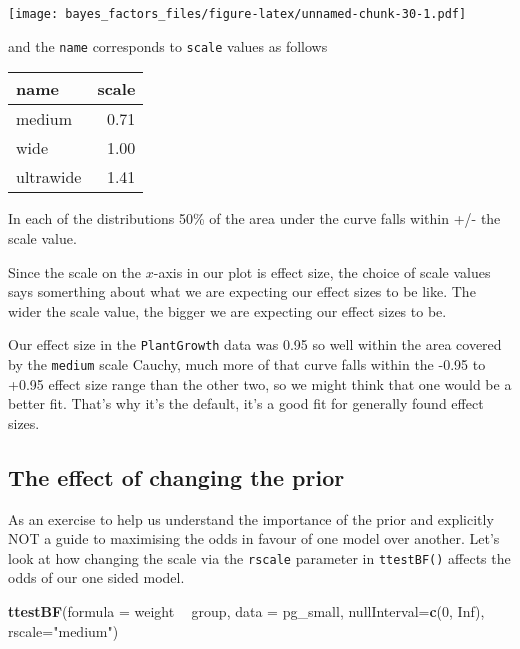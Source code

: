 \documentclass[
]{book}
\newenvironment{Shaded}{\begin{snugshade}}{\end{snugshade}}
\newcommand{\DataTypeTok}[1]{\textcolor[rgb]{0.13,0.29,0.53}{#1}}
\newcommand{\DecValTok}[1]{\textcolor[rgb]{0.00,0.00,0.81}{#1}}
\newcommand{\KeywordTok}[1]{\textcolor[rgb]{0.13,0.29,0.53}{\textbf{#1}}}
\newcommand{\NormalTok}[1]{#1}
\newcommand{\OperatorTok}[1]{\textcolor[rgb]{0.81,0.36,0.00}{\textbf{#1}}}
\newcommand{\OtherTok}[1]{\textcolor[rgb]{0.56,0.35,0.01}{#1}}
\newcommand{\StringTok}[1]{\textcolor[rgb]{0.31,0.60,0.02}{#1}}
\begin{document}
\texttt{[image: bayes\_factors\_files/figure-latex/unnamed-chunk-30-1.pdf]}

and the \texttt{name} corresponds to \texttt{scale} values as follows

\begin{tabular}{l|r}
\hline
name & scale\\
\hline
medium & 0.71\\
\hline
wide & 1.00\\
\hline
ultrawide & 1.41\\
\hline
\end{tabular}

In each of the distributions 50\% of the area under the curve falls within +/- the scale value.

Since the scale on the \(x\)-axis in our plot is effect size, the choice of scale values says somerthing about what we are expecting our effect sizes to be like. The wider the scale value, the bigger we are expecting our effect sizes to be.

Our effect size in the \texttt{PlantGrowth} data was 0.95 so well within the area covered by the \texttt{medium} scale Cauchy, much more of that curve falls within the -0.95 to +0.95 effect size range than the other two, so we might think that one would be a better fit. That's why it's the default, it's a good fit for generally found effect sizes.

\hypertarget{the-effect-of-changing-the-prior}{%
\subsection{The effect of changing the prior}\label{the-effect-of-changing-the-prior}}

As an exercise to help us understand the importance of the prior and explicitly NOT a guide to maximising the odds in favour of one model over another. Let's look at how changing the scale via the \texttt{rscale} parameter in \texttt{ttestBF()} affects the odds of our one sided model.

\begin{Shaded}
\begin{Highlighting}[]
\KeywordTok{ttestBF}\NormalTok{(}\DataTypeTok{formula =}\NormalTok{  weight }\OperatorTok{~}\StringTok{ }\NormalTok{group, }\DataTypeTok{data =}\NormalTok{ pg_small, }\DataTypeTok{nullInterval=}\KeywordTok{c}\NormalTok{(}\DecValTok{0}\NormalTok{, }\OtherTok{Inf}\NormalTok{), }\DataTypeTok{rscale=}\StringTok{"medium"}\NormalTok{)}
\end{Highlighting}
\end{Shaded}
\end{document}
